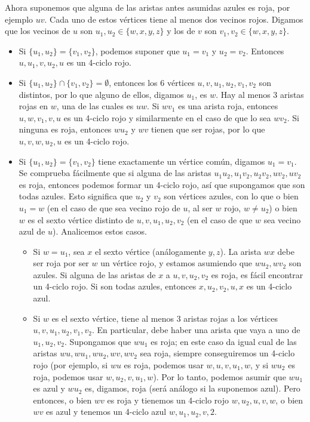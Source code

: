 \documentclass[twoside]{article}
\begin{document}
\begin{solucion}
 Ahora suponemos que alguna de las aristas antes asumidas azules es roja, por ejemplo $uv$. Cada uno de estos vértices tiene al menos dos vecinos rojos. Digamos que los vecinos de $u$ son $u_1, u_2\in \{w,x,y,z\}$ y los de $v$ son $v_1,v_2\in\{w,x,y,z\}$. 
 \begin{itemize}
 \item Si $\{u_1,u_2\}=\{v_1,v_2\}$, podemos suponer que $u_1=v_1$ y $u_2=v_2$. Entonces $u,u_1,v,u_2,u$ es un 4-ciclo rojo. 
 \item Si $\{u_1,u_2\}\cap\{v_1,v_2\}=\emptyset$, entonces los 6 vértices $u,v,u_1,u_2,v_1,v_2$ son distintos, por lo que alguno de ellos, digamos $u_1$, es $w$. Hay al menos 3 aristas rojas en $w$, una de las cuales es $uw$. Si $wv_1$ es una arista roja, entonces $u,w,v_1,v,u$ es un 4-ciclo rojo y similarmente en el caso de que lo sea $wv_2$. Si ninguna es roja, entonces $wu_2$ y $wv$ tienen que ser rojas, por lo que $u,v,w,u_2,u$ es un 4-ciclo rojo.
 \item Si $\{u_1,u_2\}=\{v_1,v_2\}$ tiene exactamente un vértice común, digamos $u_1=v_1$. Se comprueba fácilmente que si alguna de las aristas $u_1u_2, u_1v_2, u_2v_2,uv_2,uv_2$ es roja, entonces podemos formar un 4-ciclo rojo, así que supongamos que son todas azules. Esto significa que $u_2$ y $v_2$ son vértices azules, con lo que o bien $u_1=w$ (en el caso de que sea vecino rojo de $u$, al ser $w$ rojo, $w\neq u_2$) o bien $w$ es el sexto vértice distinto de $u,v,u_1,u_2,v_2$ (en el caso de que $w$ sea vecino azul de $u$). Analicemos estos casos.
 \begin{itemize}
 \item Si $w=u_1$, sea $x$ el sexto vértice (análogamente $y,z$). La arista $wx$ debe ser roja por ser $w$ un vértice rojo, y estamos asumiendo que $wu_2, wv_2$ son azules. Si alguna de las aristas de $x$ a $u,v,u_2, v_2$ es roja, es fácil encontrar un 4-ciclo rojo. Si son todas azules, entonces $x,u_2, v_2, u,x$ es un 4-ciclo azul. 
 \item Si $w$ es el sexto vértice, tiene al menos 3 aristas rojas a los vértices $u,v,u_1,u_2,v_1,v_2$. En particular, debe haber una arista que vaya a uno de $u_1,u_2,v_2$. Supongamos que $wu_1$ es roja; en este caso da igual cual de las aristas $wu,wu_1,wu_2,wv, wv_2$ sea roja, siempre conseguiremos un 4-ciclo rojo (por ejemplo, si $wu$ es roja, podemos usar $w,u,v,u_1,w$, y si $wu_2$ es roja, podemos usar $w,u_2,v,u_1,w$). Por lo tanto, podemos asumir que $wu_1$ es azul y $wu_2$ es, digamos, roja (será análogo si la suponemos azul). Pero entonces, o bien $wv$ es roja y tienemos un 4-ciclo rojo $w,u_2,u, v,w$, o bien $wv$ es azul y tenemos un 4-ciclo azul $w,u_1, u_2,v,2$.
 \end{itemize}
 \end{itemize}
 
\end{solucion}
\end{document}
